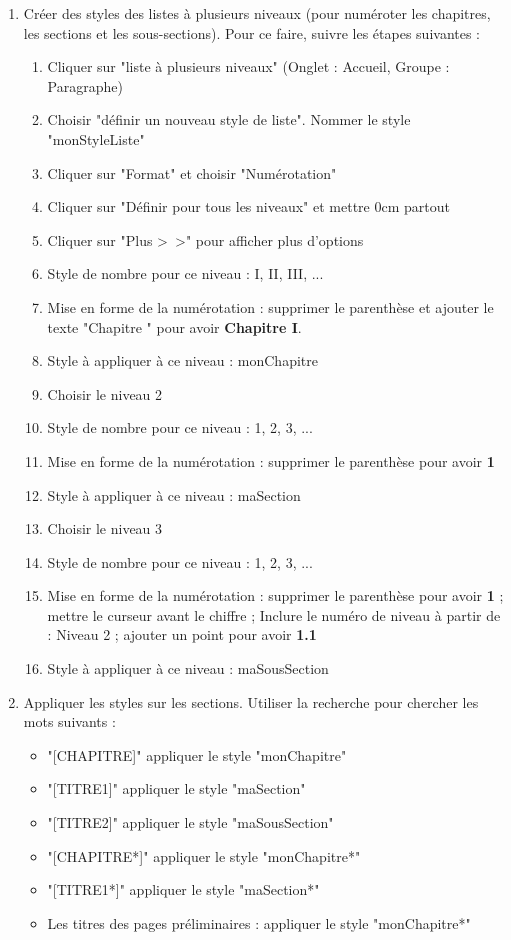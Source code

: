 \documentclass[11pt, a4paper]{article}
\begin{document}
\begin{enumerate}
	\item Créer des styles des listes à plusieurs niveaux (pour numéroter les chapitres, les sections et les sous-sections). Pour ce faire, suivre les étapes suivantes : 
	\begin{multicols}{2}
	\begin{enumerate}
		\item Cliquer sur "liste à plusieurs niveaux" (Onglet : Accueil, Groupe : Paragraphe)
		\item Choisir "définir un nouveau style de liste". Nommer le style "monStyleListe"
		\item Cliquer sur "Format" et choisir "Numérotation"
		\item Cliquer sur "Définir pour tous les niveaux" et mettre 0cm partout
		\item Cliquer sur "Plus \textgreater\ \textgreater" pour afficher plus d'options
		\item Style de nombre pour ce niveau : I, II, III, ...
		\item Mise en forme de la numérotation : supprimer le parenthèse et ajouter le texte "Chapitre " pour avoir \textbf{Chapitre I}.
		\item Style à appliquer à ce niveau : monChapitre
		\item Choisir le niveau 2
		\item Style de nombre pour ce niveau : 1, 2, 3, ...
		\item Mise en forme de la numérotation : supprimer le parenthèse pour avoir \textbf{1}
		\item Style à appliquer à ce niveau : maSection
		\item Choisir le niveau 3
		\item Style de nombre pour ce niveau : 1, 2, 3, ...
		\item Mise en forme de la numérotation : supprimer le parenthèse pour avoir \textbf{1} ; mettre le curseur avant le chiffre ; Inclure le numéro de niveau à partir de : Niveau 2 ; ajouter un point pour avoir \textbf{1.1}
		\item Style à appliquer à ce niveau : maSousSection
	\end{enumerate}
	\end{multicols}

	\item Appliquer les styles sur les sections. Utiliser la recherche pour chercher les mots suivants : 
	\begin{multicols}{2}
	\begin{itemize}
		\item "[CHAPITRE]" appliquer le style "monChapitre"
		\item "[TITRE1]" appliquer le style "maSection"
		\item "[TITRE2]" appliquer le style "maSousSection"
		\item "[CHAPITRE*]" appliquer le style "monChapitre*"
		\item "[TITRE1*]" appliquer le style "maSection*"
		\item Les titres des pages préliminaires : appliquer le style "monChapitre*"
	\end{itemize}
	\end{multicols}
	

\end{enumerate}
\end{document}
